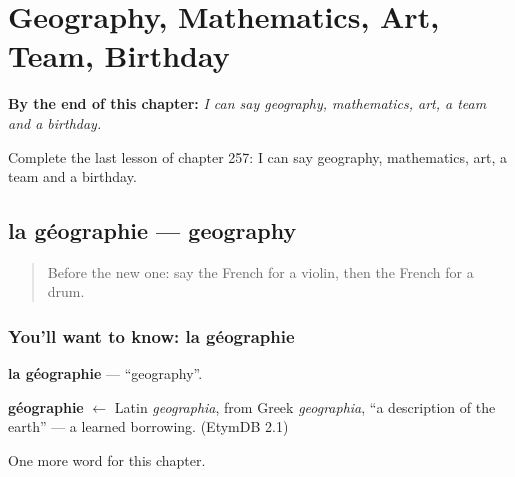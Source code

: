
\chapter{Geography, Mathematics, Art, Team, Birthday}
\label{ch:fr-geography-mathematics-art-team-birthday}

\begin{chapteropening}
\textbf{By the end of this chapter:} \emph{I can say geography, mathematics, art, a team and a birthday.}

Complete the last lesson of chapter 257: I can say geography, mathematics, art, a team and a birthday.
\end{chapteropening}

\section[la géographie]{la géographie — geography}

\label{lesson:FR-C257-geographie}



\begin{quote}
Before the new one: say the French for a violin, then the French for a drum.
\end{quote}

\subsection*{You'll want to know: la géographie}
\textbf{la géographie} — \textquotedblleft{}geography\textquotedblright{}.

\begin{cousinweb}
\textbf{géographie} $\leftarrow$ Latin \emph{geographia}, from Greek \emph{geographia}, \textquotedblleft{}a description of the earth\textquotedblright{} — a learned borrowing. (EtymDB 2.1)
\end{cousinweb}

\begin{grammarlens}[title={What you've built}]
One more word for this chapter.
\end{grammarlens}

